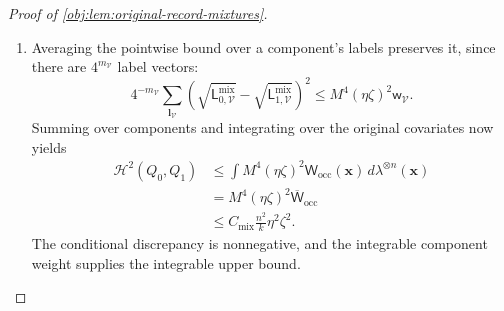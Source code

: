 \begin{proof}[Proof of \cref{obj:lem:original-record-mixtures}]
\begin{enumerate}
The same table identities used in the amplitude cases, now applied
to a block average, imply
\[
\mathsf D_{\mathcal V}^{\mathrm{mix}}(0,\zeta_0)=0,\qquad
\mathsf D_{\mathcal V}^{\mathrm{mix}}(\eta_0,0)=0,\qquad
\partial_{\eta_0}\mathsf D_{\mathcal V}^{\mathrm{mix}}(\eta_0,0)=0.
\]
For the second identity, reverse the component signs, a permutation
of their uniform prior. The two closed segments joining zero to
\(\eta\) and \(\zeta\) lie inside the certificate's signed square.
The mean value bound along the \(\zeta_0\)-segment therefore gives
\[
|\partial_{\eta_0}\mathsf D_{\mathcal V}^{\mathrm{mix}}(\eta_0,\zeta)|
\le
2M^2m_{\mathcal V}^2 2^{m_{\mathcal V}}|\zeta|
\]
for every \(\eta_0\) between zero and \(\eta\). Applying the mean value
bound along that \(\eta_0\)-segment next gives
\[
|\mathsf D_{\mathcal V}^{\mathrm{mix}}(\eta,\zeta)|
\le
2M^2m_{\mathcal V}^2 2^{m_{\mathcal V}}|\eta\zeta|.
\]
Both estimates apply to either orientation of the segments.

The positive density floors justify the square-root identity and
bound
\[
\begin{aligned}
\left(
\sqrt{\mathsf L_{0,\mathcal V}^{\mathrm{mix}}}
-\sqrt{\mathsf L_{1,\mathcal V}^{\mathrm{mix}}}
\right)^2
&=
\frac{(\mathsf D_{\mathcal V}^{\mathrm{mix}}(\eta,\zeta))^2}
{\left(
\sqrt{\mathsf L_{0,\mathcal V}^{\mathrm{mix}}}
+\sqrt{\mathsf L_{1,\mathcal V}^{\mathrm{mix}}}
\right)^2}\\
&\le
\frac{4M^4m_{\mathcal V}^4 4^{m_{\mathcal V}}(\eta\zeta)^2}
{4\,2^{-m_{\mathcal V}}}\\
&=M^4(\eta\zeta)^2\mathsf w_{\mathcal V}.
\end{aligned}
\]
This proves the pointwise component bound for every block, including
the unused-sign block.

\item Averaging the pointwise bound over a component's labels preserves
it, since there are \(4^{m_{\mathcal V}}\) label vectors:
\[
4^{-m_{\mathcal V}}
\sum_{\boldsymbol l_{\mathcal V}}
\left(
\sqrt{\mathsf L_{0,\mathcal V}^{\mathrm{mix}}}
-\sqrt{\mathsf L_{1,\mathcal V}^{\mathrm{mix}}}
\right)^2
\le M^4(\eta\zeta)^2\mathsf w_{\mathcal V}.
\]
Summing over components and integrating over the original covariates
now yields
\[
\begin{aligned}
\mathcal H^2(Q_0,Q_1)
&\le
\int M^4(\eta\zeta)^2\mathsf W_{\mathrm{occ}}(\mathbf x)\,
d\lambda^{\otimes n}(\mathbf x)\\
&=M^4(\eta\zeta)^2\overline{\mathsf W}_{\mathrm{occ}}\\
&\le C_{\mathrm{mix}}\frac{n^2}{k}\eta^2\zeta^2.
\end{aligned}
\]
The conditional discrepancy is nonnegative, and the integrable
component weight supplies the integrable upper bound.


\end{enumerate}
\end{proof}
